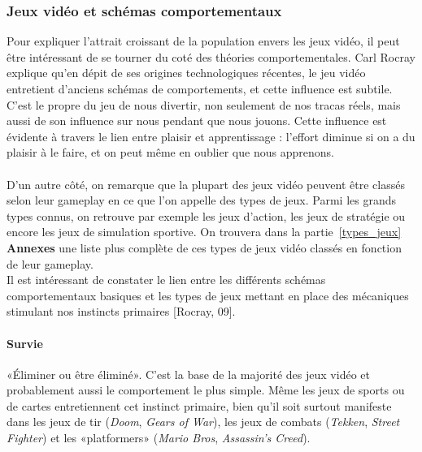	\subsubsection{Jeux vidéo et schémas comportementaux}
Pour expliquer l'attrait croissant de la population envers les jeux vidéo, il peut être intéressant de se tourner du coté des théories comportementales. Carl Rocray \cite{Rocr09} explique qu'en dépit de ses origines technologiques récentes, le jeu vidéo entretient d’anciens schémas de comportements, et cette influence est subtile. C’est le propre du jeu de nous divertir, non seulement de nos tracas réels, mais aussi de son influence sur nous pendant que nous jouons. Cette influence est évidente à travers le lien entre plaisir et apprentissage : l’effort diminue si on a du plaisir à le faire, et on peut même en oublier que nous apprenons.

\paragraph{}D'un autre côté, on remarque que la plupart des jeux vidéo peuvent être classés selon leur gameplay en ce que l'on appelle des types de jeux. Parmi les grands types connus, on retrouve par exemple les jeux d'action, les jeux de stratégie ou encore les jeux de simulation sportive. On trouvera dans la partie~\ref{types_jeux} \textbf{Annexes} une liste plus complète de ces types de jeux vidéo classés en fonction de leur gameplay. \\

Il est intéressant de constater le lien entre les différents schémas comportementaux basiques et les types de jeux mettant en place des mécaniques stimulant nos instincts primaires [Rocray, 09]\cite{Rocr09}.

\paragraph{}
		\paragraph{Survie \\ \quad}
«Éliminer ou être éliminé». C’est la base de la majorité des jeux vidéo et probablement aussi le comportement le plus simple. Même les jeux de sports ou de cartes entretiennent cet instinct primaire, bien qu’il soit surtout manifeste dans les jeux de tir (\emph{Doom}, \emph{Gears of War}), les jeux de combats (\emph{Tekken}, \emph{Street Fighter}) et les «platformers» (\emph{Mario Bros}, \emph{Assassin’s Creed}).
